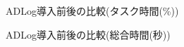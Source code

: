 \begin{figure}[hb]
	\begin{center}
		\caption{ADLog導入前後の比較(タスク時間(\%))}
		\label{fig:12}
	\end{center}
\end{figure}

\begin{figure}[hb]
	\begin{center}
		\caption{ADLog導入前後の比較(総合時間(秒))}
		\label{fig:13}
	\end{center}
\end{figure}

